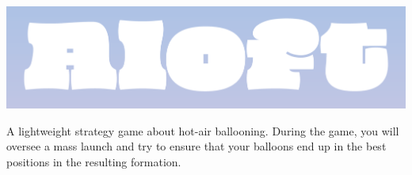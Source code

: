 \documentclass[a5paper, DIV=18, 12pt]{scrartcl}
\begin{document}
\vspace{-1ex}
\begin{center}
\includegraphics[width=\textwidth]{Images/aloft_banner.png}
\end{center}
\vspace{-0.5ex}
\flushleft
A lightweight strategy game about hot-air ballooning. During the game, you will oversee a mass launch and try to ensure that your balloons end up in the best positions in the resulting formation.
\flushleft
\vspace{-0ex}
\end{document}
